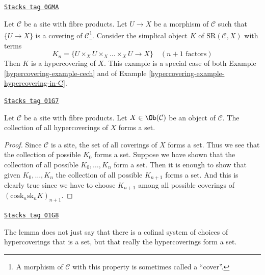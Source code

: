 \begin{example}

\label{hypercovering-example-cech-cover}
\href{https://stacks.math.columbia.edu/tag/0GMA}{\texttt{Stacks tag 0GMA}}

Let $\mathcal{C}$ be a site with fibre products. Let $U \to X$ be a
morphism of $\mathcal{C}$ such that $\{U \to X\}$ is a covering of
$\mathcal{C}$\footnote{A morphism of $\mathcal{C}$ with this property
is sometimes called a ``cover''.}. Consider the simplical object $K$ of
$\text{SR}(\mathcal{C}, X)$ with terms
$$
K_n = \{U \times_X U \times_X \ldots \times_X U \to X\}
\quad (n + 1 \text{ factors})
$$
Then $K$ is a hypercovering of $X$. This example is a special case of both
Example \ref{hypercovering-example-cech} and of
Example \ref{hypercovering-example-hypercovering-in-C}.
\end{example}

\begin{lemma}
\label{hypercovering-lemma-hypercoverings-set}
\href{https://stacks.math.columbia.edu/tag/01G7}{\texttt{Stacks tag 01G7}}

Let $\mathcal{C}$ be a site with fibre products.
Let $X \in \Ob(\mathcal{C})$ be an object of $\mathcal{C}$.
The collection of all hypercoverings of $X$ forms a set.
\end{lemma}

\begin{proof}
Since $\mathcal{C}$ is a site, the set of all coverings of
$X$ forms a set. Thus we see that the collection
of possible $K_0$ forms a set. Suppose we have shown that
the collection of all possible $K_0, \ldots, K_n$ form
a set. Then it is enough to show that given
$K_0, \ldots, K_n$ the collection of all possible
$K_{n + 1}$ forms a set. And this is clearly true since
we have to choose $K_{n + 1}$ among all possible coverings
of $(\text{cosk}_n \text{sk}_n K)_{n + 1}$.
\end{proof}

\begin{remark}
\label{hypercovering-remark-hypercoverings-really-set}
\href{https://stacks.math.columbia.edu/tag/01G8}{\texttt{Stacks tag 01G8}}

The lemma does not just say that there is a cofinal
system of choices of hypercoverings that is a set,
but that really the hypercoverings form a set.
\end{remark}

